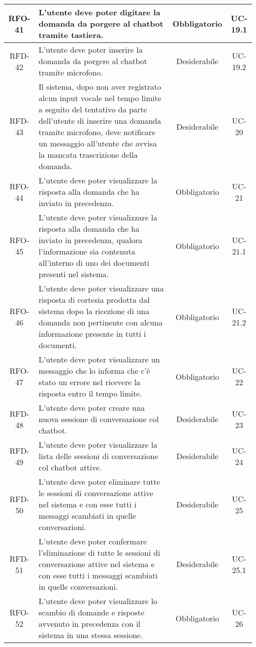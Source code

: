 \begin{xltabular}{\textwidth}{| c | X | c | c |}
    \hline
    RFO-41 & L’utente deve poter digitare la domanda da porgere al chatbot tramite tastiera. & Obbligatorio & UC-19.1 \\
    \hline
    RFD-42 & L’utente deve poter inserire la domanda da porgere al chatbot tramite microfono. & Desiderabile & UC-19.2 \\
    \hline
    RFD-43 & Il sistema, dopo non aver registrato alcun input vocale nel tempo limite a seguito del tentativo da parte dell'utente di inserire una domanda tramite microfono, deve notificare un messaggio all'utente che avvisa la mancata trascrizione della domanda. & Desiderabile & UC-20 \\
    \hline
    RFO-44 & L’utente deve poter visualizzare la risposta alla domanda che ha inviato in precedenza. & Obbligatorio & UC-21 \\
    \hline
    RFO-45 & L’utente deve poter visualizzare la risposta alla domanda che ha inviato in precedenza, qualora l'informazione sia contenuta all'interno di uno dei documenti presenti nel sistema. & Obbligatorio & UC-21.1 \\
    \hline
    RFO-46 & L’utente deve poter visualizzare una risposta di cortesia prodotta dal sistema dopo la ricezione di una domanda non pertinente con alcuna informazione presente in tutti i documenti. & Obbligatorio & UC-21.2 \\
    \hline
    RFO-47 & L'utente deve poter visualizzare un messaggio che lo informa che c'è stato un errore nel ricevere la risposta entro il tempo limite. & Obbligatorio & UC-22 \\
    \hline
    RFD-48 & L’utente deve poter creare una nuova sessione di conversazione col chatbot. & Desiderabile & UC-23 \\
    \hline
    RFD-49 & L’utente deve poter visualizzare la lista delle sessioni di conversazione col chatbot attive. & Desiderabile & UC-24 \\
    \hline
    RFD-50 & L’utente deve poter eliminare tutte le sessioni di conversazione attive nel sistema e con esse tutti i messaggi scambiati in quelle conversazioni. & Desiderabile & UC-25 \\
    \hline
    RFD-51 & L’utente deve poter confermare l’eliminazione di tutte le sessioni di conversazione attive nel sistema e con esse tutti i messaggi scambiati in quelle conversazioni. & Desiderabile & UC-25.1 \\
    \hline
    RFO-52 & L’utente deve poter visualizzare lo scambio di domande e risposte avvenuto in precedenza con il sistema in una stessa sessione. & Obbligatorio & UC-26 \\

\end{xltabular}

